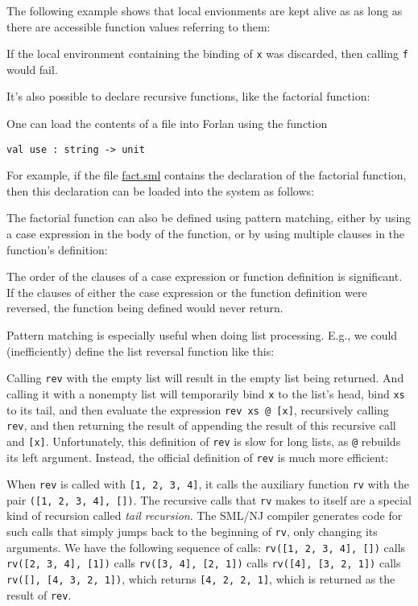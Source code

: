 The following example shows that local envionments are kept alive as
as long as there are accessible function values referring to them:

If the local environment containing the binding of \texttt{x} was
discarded, then calling \texttt{f} would fail.

It's also possible to declare recursive functions, like the
%
factorial function:

One can load the contents of a file into Forlan using the function
\begin{verbatim}
val use : string -> unit
\end{verbatim}
%
For example, if the file \url{fact.sml} contains the declaration of
the factorial function, then this declaration can be loaded into the
system as follows:


The factorial function can also be defined using pattern matching,
either by using a case expression in the body of the function, or
by using multiple clauses in the function's definition:

The order of the clauses of a case expression or function definition
is significant.  If the clauses of either the case expression or
the function definition were reversed, the function being defined
would never return.

Pattern matching is especially useful when doing list processing.
E.g., we could (inefficiently) define the list reversal function like
this:

Calling \texttt{rev} with the empty list will result in the empty
list being returned.  And calling it with a nonempty list will
temporarily bind \texttt{x} to the list's head, bind \texttt{xs} to its
tail, and then evaluate the expression \texttt{rev~xs~@~[x]},
recursively calling \texttt{rev}, and then returning the result of
appending the result of this recursive call and \texttt{[x]}.
Unfortunately, this definition of \texttt{rev} is slow for long lists,
as \texttt{@} rebuilds its left argument. Instead, the official
definition of \texttt{rev} is much more efficient:

When \texttt{rev} is called with \texttt{[1, 2, 3, 4]}, it
calls the auxiliary function \texttt{rv} with the pair
\texttt{([1, 2, 3, 4], [])}. The recursive calls that
\texttt{rv} makes to itself are a special kind of recursion
called \emph{tail recursion}.
%
%
The SML/NJ compiler generates
code for such calls that simply jumps back to the beginning of \texttt{rv},
only changing its arguments.
We have the following sequence of calls: \texttt{rv([1, 2, 3, 4], [])}
calls \texttt{rv([2, 3, 4], [1])} calls \texttt{rv([3, 4], [2, 1])}
calls \texttt{rv([4], [3, 2, 1])} calls \texttt{rv([], [4, 3, 2, 1])},
which returns \texttt{[4, 2, 2, 1]}, which is returned as the result
of \texttt{rev}.

